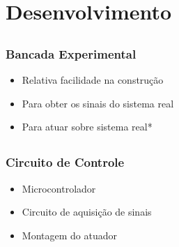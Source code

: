 \documentclass{beamer}
\begin{document}
\section{Desenvolvimento}
\subsection{}
\begin{frame}
  \frametitle{Bancada Experimental}
  \begin{itemize}
    \item Relativa facilidade na construção
    \item Para obter os sinais do sistema real
    \item Para atuar sobre sistema real*
  \end{itemize}
\end{frame}

\begin{frame}
\begin{figure}
 \centering
   \hfil
   \hfil
   \hfil
 \end{figure}
\end{frame}

\subsection{}
\begin{frame}
 \frametitle{Circuito de Controle}
  \begin{itemize}
    \item Microcontrolador
    \item Circuito de aquisição de sinais
    \item Montagem do atuador
  \end{itemize}
\end{frame}
\end{document}
